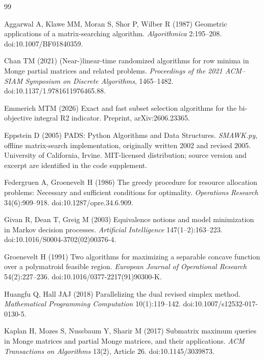 \begin{thebibliography}{99}\raggedright
{}
Aggarwal A, Klawe MM, Moran S, Shor P, Wilber R (1987) Geometric applications of a matrix-searching algorithm. \emph{Algorithmica} 2:195--208. doi:10.1007/BF01840359.

Chan TM (2021) (Near-)linear-time randomized algorithms for row minima in Monge partial matrices and related problems. \emph{Proceedings of the 2021 ACM--SIAM Symposium on Discrete Algorithms}, 1465--1482. doi:10.1137/1.9781611976465.88.

Emmerich MTM (2026) Exact and fast subset selection algorithms for the bi-objective integral R2 indicator. Preprint, arXiv:2606.23365.

Eppstein D (2005) PADS: Python Algorithms and Data Structures. \emph{SMAWK.py}, offline matrix-search implementation, originally written 2002 and revised 2005. University of California, Irvine. MIT-licensed distribution; source version and excerpt are identified in the code supplement.

Federgruen A, Groenevelt H (1986) The greedy procedure for resource allocation problems: Necessary and sufficient conditions for optimality. \emph{Operations Research} 34(6):909--918. doi:10.1287/opre.34.6.909.

Givan R, Dean T, Greig M (2003) Equivalence notions and model minimization in Markov decision processes. \emph{Artificial Intelligence} 147(1--2):163--223. doi:10.1016/S0004-3702(02)00376-4.

Groenevelt H (1991) Two algorithms for maximizing a separable concave function over a polymatroid feasible region. \emph{European Journal of Operational Research} 54(2):227--236. doi:10.1016/0377-2217(91)90300-K.

Huangfu Q, Hall JAJ (2018) Parallelizing the dual revised simplex method. \emph{Mathematical Programming Computation} 10(1):119--142. doi:10.1007/s12532-017-0130-5.

Kaplan H, Mozes S, Nussbaum Y, Sharir M (2017) Submatrix maximum queries in Monge matrices and partial Monge matrices, and their applications. \emph{ACM Transactions on Algorithms} 13(2), Article 26. doi:10.1145/3039873.


\end{thebibliography}
